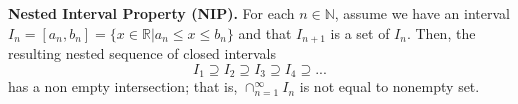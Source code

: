 \documentclass[12pt, a3paper, openany]{book}
\begin{document}
\begin{theorem}{}{}
\textbf{Nested Interval Property (NIP).} For each $n\in \mathbb{N}$, assume we have an interval $I_{n}=[a_{n}, b_{n}]=\{x \in \mathbb{R}|a_{n} \leq x \leq b_{n}\}$ and that $I_{n+1}$ is a set of $I_{n}$. Then, the resulting nested sequence of closed intervals
\begin{equation*}
    I_1 \supseteq I_2 \supseteq I_3 \supseteq I_4 \supseteq ...
\end{equation*}
has a non empty intersection; that is, $\cap_{n=1}^{\infty} I_{n}$ is not equal to nonempty set.

\end{theorem}
\end{document}
